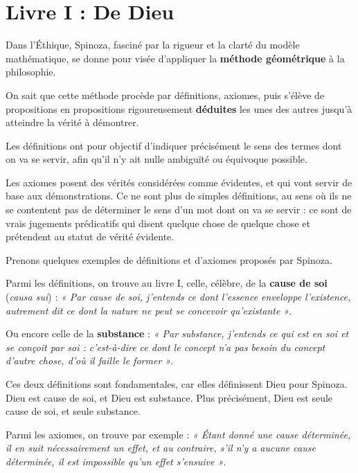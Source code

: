 
\section{Livre I : De Dieu}

Dans l’Éthique, Spinoza, fasciné par la rigueur et la clarté du modèle
mathématique, se donne pour visée d’appliquer la {\bf méthode géométrique} à la
philosophie.

On sait que cette méthode procède par définitions, axiomes, puis s’élève de
propositions en propositions rigoureusement {\bf déduites} les unes des autres
jusqu’à atteindre la vérité à démontrer.

\vspace{0.5cm}
Les définitions ont pour objectif d’indiquer précisément le sens des termes
dont on va se servir, afin qu’il n’y ait nulle ambiguïté ou équivoque possible.

Les axiomes posent des vérités considérées comme évidentes, et qui vont servir
de base aux démonstrations. Ce ne sont plus de simples définitions, au sens où
ils ne se contentent pas de déterminer le sens d’un mot dont on va se servir :
ce sont de vrais jugements prédicatifs qui disent quelque chose de quelque
chose et prétendent au statut de vérité évidente.

\vspace{0.5cm}
Prenons quelques exemples de définitions et d’axiomes proposés par Spinoza.

Parmi les définitions, on trouve au livre I, celle, célèbre, de la {\bf cause de soi}
({\it causa sui}) : {\it « Par cause de soi, j’entends ce dont l’essence enveloppe
l’existence, autrement dit ce dont la nature ne peut se concevoir qu’existante »}.

Ou encore celle de la {\bf substance} : {\it « Par substance, j’entends ce qui est en soi
et se conçoit par soi : c’est-à-dire ce dont le concept n’a pas besoin du
concept d’autre chose, d’où il faille le former »}.

Ces deux définitions sont fondamentales, car elles définissent Dieu pour
Spinoza. Dieu est cause de soi, et Dieu est substance. Plus précisément,
Dieu est seule cause de soi, et seule substance.

Parmi les axiomes, on trouve par exemple : {\it « Étant donné une cause déterminée,
il en suit nécessairement un effet, et au contraire, s’il n’y a aucune cause
déterminée, il est impossible qu’un effet s’ensuive »}.


